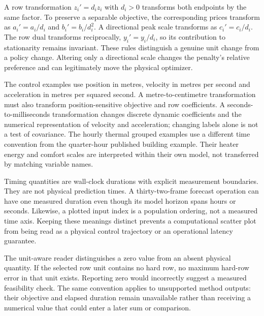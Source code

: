 A row transformation $z_i'=d_i z_i$ with $d_i>0$ transforms both endpoints by the
same factor. To preserve a separable objective, the corresponding prices transform
as $a_i'=a_i/d_i$ and $b_i'=b_i/d_i^2$. A directional peak scale transforms as
$c_i'=c_i/d_i$. The row dual transforms reciprocally, $y_i'=y_i/d_i$, so its
contribution to stationarity remains invariant. These rules distinguish a genuine
unit change from a policy change. Altering only a directional scale changes the
penalty's relative preference and can legitimately move the physical optimizer.

The control examples use position in metres, velocity in metres per second and
acceleration in metres per squared second. A metre-to-centimetre transformation
must also transform position-sensitive objective and row coefficients. A seconds-
to-milliseconds transformation changes discrete dynamic coefficients and the
numerical representation of velocity and acceleration; changing labels alone is
not a test of covariance. The hourly thermal grouped examples use a different
time convention from the quarter-hour published building example. Their heater
energy and comfort scales are interpreted within their own model, not transferred
by matching variable names.

Timing quantities are wall-clock durations with explicit measurement boundaries.
They are not physical prediction times. A thirty-two-frame forecast operation
can have one measured duration even though its model horizon spans hours or
seconds. Likewise, a plotted input index is a population ordering, not a measured
time axis. Keeping these meanings distinct prevents a computational scatter plot
from being read as a physical control trajectory or an operational latency guarantee.

The unit-aware reader distinguishes a zero value from an absent physical
quantity. If the selected row unit contains no hard row, no maximum hard-row
error in that unit exists. Reporting zero would incorrectly suggest a measured
feasibility check. The same convention applies to unsupported method outputs:
their objective and elapsed duration remain unavailable rather than receiving
a numerical value that could enter a later sum or comparison.
